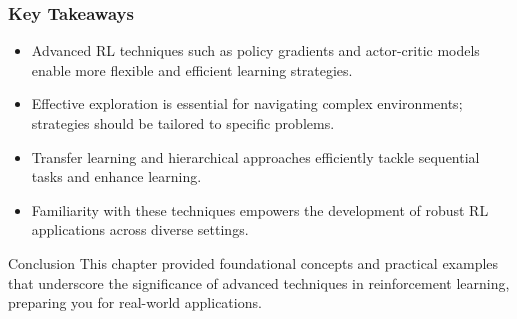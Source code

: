 \documentclass[aspectratio=169]{beamer}
\begin{document}
\begin{frame}[fragile]
    \frametitle{Key Takeaways}
    \begin{itemize}
        \item Advanced RL techniques such as policy gradients and actor-critic models enable more flexible and efficient learning strategies.
        \item Effective exploration is essential for navigating complex environments; strategies should be tailored to specific problems.
        \item Transfer learning and hierarchical approaches efficiently tackle sequential tasks and enhance learning.
        \item Familiarity with these techniques empowers the development of robust RL applications across diverse settings.
    \end{itemize}
    
    \begin{block}{Conclusion}
        This chapter provided foundational concepts and practical examples that underscore the significance of advanced techniques in reinforcement learning, preparing you for real-world applications.
    \end{block}
\end{frame}
\end{document}
